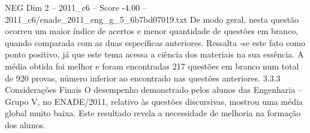 \begin{textsample}{NEG Dim 2 – 2011\_c6 – Score -4.00 – 2011\_c6/enade\_2011\_eng\_g\_5\_6b7bd07019.txt}
De modo geral, nesta questão ocorreu um maior índice de acertos e menor quantidade de questões em branco, quando comparada com as duas específicas anteriores.
Ressalta -se este fato como ponto positivo, já que este tema acessa a ciência dos materiais na sua essência.
A média obtida foi melhor e foram encontradas 217 questões em branco num total de 920 provas, número inferior ao encontrado nas questões anteriores. 3.3.3 Considerações Finais O desempenho demonstrado pelos alunos das Engenharia – Grupo V, no ENADE/2011, relativo às questões discursivas, mostrou uma média global muito baixa.
Este resultado revela a necessidade de melhoria na formação dos alunos.

\end{textsample}
